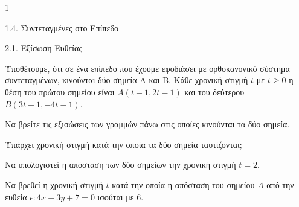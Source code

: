 \begin{ylh}{1}
    \item 1.4. Συντεταγμένες στο Επίπεδο
    \item 2.1. Εξίσωση Ευθείας
\end{ylh}
Υποθέτουμε, ότι σε ένα επίπεδο που έχουμε εφοδιάσει με ορθοκανονικό σύστημα συντεταγμένων, κινούνται δύο σημεία A και B. Κάθε χρονική στιγμή $t$ με $t \ge 0$ η θέση του πρώτου σημείου είναι $A(t-1, 2t-1)$ και του δεύτερου $B(3t-1, -4t-1)$.
\begin{alist}
    \item Να βρείτε τις εξισώσεις των γραμμών πάνω στις οποίες κινούνται τα δύο σημεία. 
    \item Υπάρχει χρονική στιγμή κατά την οποία τα δύο σημεία ταυτίζονται; 
    \item Να υπολογιστεί η απόσταση των δύο σημείων την χρονική στιγμή $t=2$. 
    \item Να βρεθεί η χρονική στιγμή $t$ κατά την οποία η απόσταση του σημείου $A$ από την ευθεία $\epsilon: 4x+3y+7=0$ ισούται με $6$. 
\end{alist}